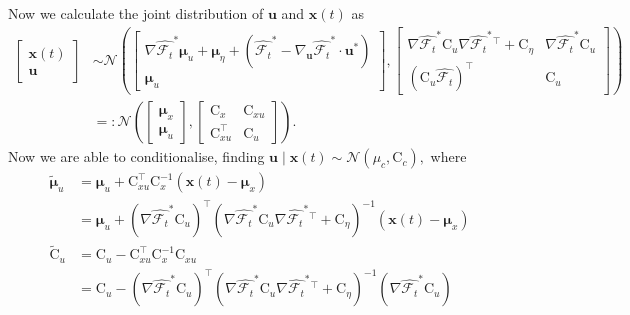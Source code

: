 \documentclass{article}
\newcommand{\vv}[1]{\boldsymbol{#1}}
\newcommand{\mm}[1]{\mathrm{#1}}
\newcommand{\dist}[1]{\mathcal{#1}}
\newcommand{\gvn}{\mid}
\begin{document}
Now we calculate the joint distribution of \(\vv{u}\) and \(\vv{x}(t)\) as
\begin{align}
    \begin{bmatrix}
      \vv{x}(t) \\ \vv{u}
    \end{bmatrix}
  &\sim\dist{N}\left(\begin{bmatrix}
   \nabla \widehat{\mathcal{F}_{t}}^*\vv{\mu}_u +\vv{\mu}_{\eta}
  +\left(\widehat{\mathcal{F}_{t}}^* -\nabla_{\vv{u}} \widehat{\mathcal{F}_{t}}^*\cdot \vv{u}^*\right)\\ \vv{\mu}_u
\end{bmatrix},
\begin{bmatrix}
  \nabla \widehat{\mathcal{F}_{t}}^* \mm{C}_u\nabla \widehat{\mathcal{F}_{t}}^*{}^\top +\mm{C}_{\eta} & \nabla \widehat{\mathcal{F}_{t}}^* \mm{C}_u\\
  \left(\mm{C}_{u}\widehat{\mathcal{F}_{t}}\right)^\top & \mm{C}_{u}
\end{bmatrix}
\right)\\
&=:\dist{N}\left(\begin{bmatrix}
   \vv{\mu}_x\\
   \vv{\mu}_u
\end{bmatrix},
\begin{bmatrix}
  \mm{C}_{x} & \mm{C}_{xu} \\
  \mm{C}_{xu}^\top & \mm{C}_{u}
\end{bmatrix}\right).
\end{align}
Now we are able to conditionalise, finding \(\vv{u}\gvn \vv{x}(t)\sim\dist{N}(\mu_c,\mm{C}_c),\)
where
\begin{align}
\tilde{\boldsymbol{\mu}}_{u}
&=\boldsymbol{\mu}_{u}+\mm{C}_{xu}^{\top} \mm{C}_{x}^{-1}\left(\vv{x}(t)-\boldsymbol{\mu}_{x}\right) \\
&=\vv{\mu}_u + \left(\nabla \widehat{\mathcal{F}_{t}}^* \mm{C}_u \right)^\top\left(\nabla \widehat{\mathcal{F}_{t}}^* \mm{C}_u\nabla \widehat{\mathcal{F}_{t}}^*{}^\top +\mm{C}_{\eta} \right)^{-1} \left(\vv{x}(t)-\vv{\mu}_x\right)\label{eq:linearizedpostmean}\\
\tilde{\mm{C}}_{u}
&=\mm{C}_{u}-\mm{C}_{xu}^{\top} \mm{C}_{x}^{-1} \mm{C}_{xu}\\
&=\mm{C}_{u} - \left(\nabla \widehat{\mathcal{F}_{t}}^* \mm{C}_u \right)^\top\left(\nabla \widehat{\mathcal{F}_{t}}^* \mm{C}_u\nabla \widehat{\mathcal{F}_{t}}^*{}^\top +\mm{C}_{\eta} \right)^{-1}\left(\nabla \widehat{\mathcal{F}_{t}}^* \mm{C}_u \right)\label{eq:linearizedpostvar}
\end{align}
\end{document}
